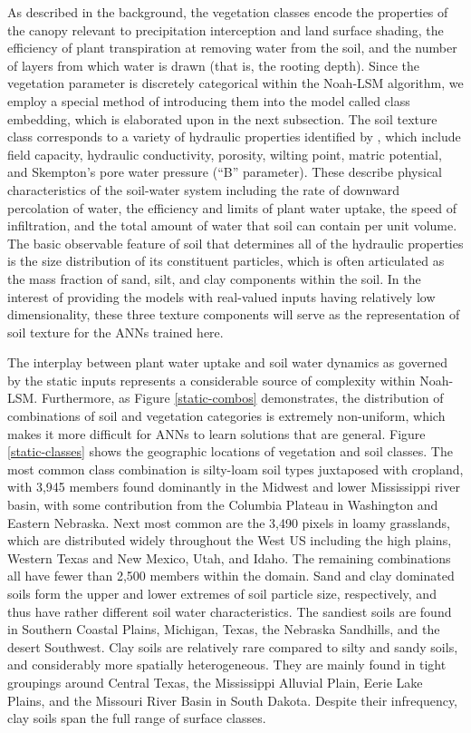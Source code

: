 As described in the background, the vegetation classes encode the properties of the canopy relevant to precipitation interception and land surface shading, the efficiency of plant transpiration at removing water from the soil, and the number of layers from which water is drawn (that is, the rooting depth). Since the vegetation parameter is discretely categorical within the Noah-LSM algorithm, we employ a special method of introducing them into the model called class embedding, which is elaborated upon in the next subsection.  The soil texture class corresponds to a variety of hydraulic properties identified by \citep{cosby_statistical_1984}, which include field capacity, hydraulic conductivity, porosity, wilting point, matric potential, and Skempton's pore water pressure (``B'' parameter). These describe physical characteristics of the soil-water system including the rate of downward percolation of water, the efficiency and limits of plant water uptake, the speed of infiltration, and the total amount of water that soil can contain per unit volume. The basic observable feature of soil that determines all of the hydraulic properties is the size distribution of its constituent particles, which is often articulated as the mass fraction of sand, silt, and clay components within the soil. In the interest of providing the models with real-valued inputs having relatively low dimensionality, these three texture components will serve as the representation of soil texture for the ANNs trained here.

The interplay between plant water uptake and soil water dynamics as governed by the static inputs represents a considerable source of complexity within Noah-LSM. Furthermore, as Figure \ref{static-combos} demonstrates, the distribution of combinations of soil and vegetation categories is extremely non-uniform, which makes it more difficult for ANNs to learn solutions that are general. Figure \ref{static-classes} shows the geographic locations of vegetation and soil classes. The most common class combination is silty-loam soil types juxtaposed with cropland, with 3,945 members found dominantly in the Midwest and lower Mississippi river basin, with some contribution from the Columbia Plateau in Washington and Eastern Nebraska. Next most common are the 3,490 pixels in loamy grasslands, which are distributed widely throughout the West US including the high plains, Western Texas and New Mexico,  Utah, and Idaho. The remaining combinations all have fewer than 2,500 members within the domain. Sand and clay dominated soils form the upper and lower extremes of soil particle size, respectively, and thus have rather different soil water characteristics. The sandiest soils are found in Southern Coastal Plains, Michigan, Texas, the Nebraska Sandhills, and the desert Southwest. Clay soils are relatively rare compared to silty and sandy soils, and considerably more spatially heterogeneous. They are mainly found in tight groupings around Central Texas, the Mississippi Alluvial Plain, Eerie Lake Plains, and the Missouri River Basin in South Dakota. Despite their infrequency, clay soils span the full range of surface classes.

